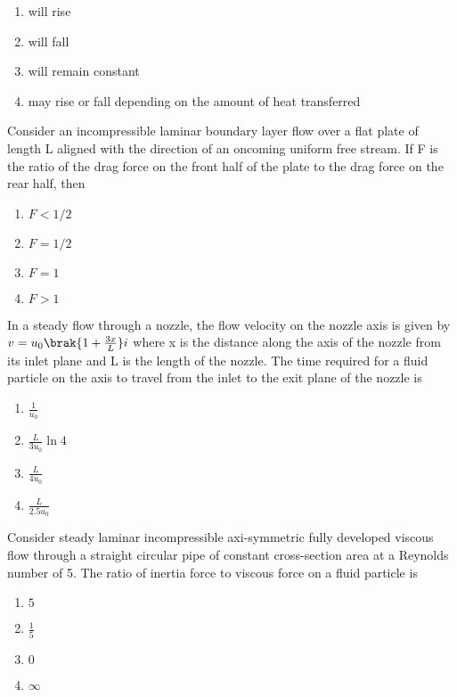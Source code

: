     \begin{enumerate}
        \item will rise 
        \item will fall
        \item will remain constant
        \item may rise or fall depending on the amount of heat transferred 
    \end{enumerate}
\bigskip
\item Consider an incompressible laminar boundary layer flow over a flat plate of length L aligned with the direction of an oncoming uniform free stream. If F is the ratio of the drag force on the front half of the plate to the drag force on the rear half, then
\begin{multicols}{4}
    \begin{enumerate}
        \item $F<1/2$
        \item $F=1/2$
        \item $F=1$
        \item $F>1$
    \end{enumerate}
\end{multicols}
\bigskip
\item In a steady flow through a nozzle, the flow velocity on the nozzle axis is given by $v = u_{0}\brak{1 + \frac{3x}{L}} i$ where x is the distance along the axis of the nozzle from its inlet plane and L is the length of the nozzle. The time required for a fluid particle on the axis to travel from the inlet to the exit plane of the nozzle is
\begin{multicols}{4}
    \begin{enumerate}
        \item $\frac{1}{u_{0}}$
        \item $\frac{L}{3u_{0}}\ln{4}$
        \item $\frac{L}{4u_{0}}$
        \item $\frac{L}{2.5u_{0}}$
    \end{enumerate}
\end{multicols}
\bigskip
\item Consider steady laminar  incompressible axi-symmetric fully developed viscous flow through a straight circular pipe of constant cross-section area at a Reynolds number of 5. The ratio of inertia force to viscous force on a fluid particle is 
\begin{multicols}{4}
    \begin{enumerate}
        \item $5$
        \item $\frac{1}{5}$
        \item $0$
        \item $\infty$
    \end{enumerate}
\end{multicols}
